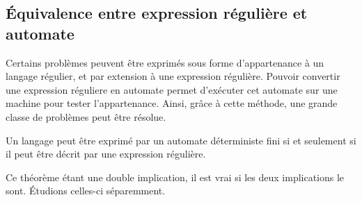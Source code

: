 
\subsection{Équivalence entre expression régulière et automate}\label{adf:eq}

Certains problèmes peuvent être exprimés sous forme d'appartenance à un langage régulier, et par extension à une expression régulière.
Pouvoir convertir une expression réguliere en automate permet d'exécuter cet automate sur une machine pour tester l'appartenance. Ainsi, grâce à cette méthode, une grande classe de problèmes peut être résolue.


\begin{theorem}
	Un langage peut être exprimé par un automate déterministe fini si et seulement si il peut être décrit par une expression régulière.
\end{theorem}

Ce théorème étant une double implication, il est vrai si les deux implications le sont. Étudions celles-ci séparemment.


